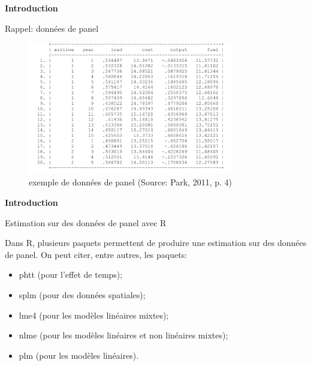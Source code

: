 \documentclass{beamer}
\begin{document}
\begin{frame}{\textbf{Introduction}}
\begin{block}{Rappel: donn\'ees de panel}
\end{block}
\begin{figure}
\begin{center}
\includegraphics [width=9cm] {Panel.png} 
\end{center}
\caption{exemple de donn\'ees de panel (Source: Park, 2011, p. 4)}
\label{exemple de donn\'ees de panel (Source: Park, 2011, p. 4)}
\end{figure}
\end{frame}
\begin{frame}{\textbf{Introduction}}
\begin{block}{Estimation sur des donn\'ees de panel avec R}
\end{block}
Dans R, plusieurs paquets permettent de produire une estimation sur des donn\'ees de panel. On peut citer, entre autres, les paquets: 
\begin{itemize}
\item phtt (pour l'effet de temps);
\item splm (pour des donn\'ees spatiales);
\item lme4 (pour les mod\`eles lin\'eaires mixtes);
\item nlme (pour les mod\`eles lin\'eaires et non lin\'eaires mixtes);
\item plm (pour les mod\`eles lin\'eaires). 
\end{itemize}
\end{frame}
\end{document}
